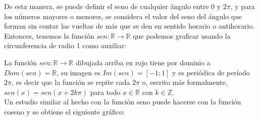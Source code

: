 \documentclass[Análisis.root.tex]{subfiles}
\newcommand{\Z}{\mathbb{Z}}
\newcommand{\R}{\mathbb{R}}
\begin{document}
        De esta manera, se puede definir el seno de cualquier ángulo entre 0 y \(2\pi\), y para los números mayores o menores, se considera el valor del seno del ángulo que forman sin contar las vueltas de más que se den en sentido horario o antihorario. Entonces, tenemos la función \(sen : \R \rightarrow \R\) que podemos graficar usando la circunferencia de radio 1 como auxiliar:
        \begin{center}
            \begin{scaletikzpicturetowidth}{\linewidth}
            \end{scaletikzpicturetowidth}
        \end{center}
        La función \(sen: \R\rightarrow\R\) dibujada arriba en rojo tiene por dominio a \(Dom(sen) = \R\), su imagen es \(Im(sen) = [−1; 1]\) y es periódica de período \(2\pi\), es decir que la función se repite cada \(2\pi\) o, escrito más formalmente, \(sen(x) = sen(x + 2k\pi)\) para todo \(x \in \R\) con \(k \in \Z\).\\
        Un estudio similar al hecho con la función seno puede hacerse con la función coseno y se obtiene el siguiente gráfico:
        \begin{center}
        \end{center}
\end{document}

